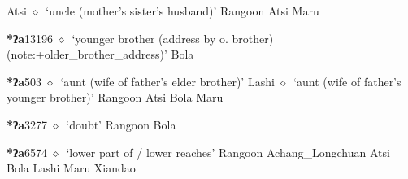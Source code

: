 \begin{list}{}{\leftmargin=1.5em \itemindent=-1.5em}
         Atsi 
\hspace{1ex}
         $\diamond$~`uncle (mother's sister's husband)'
         Rangoon 
\hspace{1ex}
         Atsi 
\hspace{1ex}
         Maru 
  \item {\footnotesize \textbf{*ʔa}}{\tiny 13196}
\hspace{1ex}
         $\diamond$~`younger brother (address by o. brother) (note:+older_brother_address)'
         Bola 
  \item {\footnotesize \textbf{*ʔa}}{\tiny 503}
\hspace{1ex}
         $\diamond$~`aunt (wife of father's elder brother)'
         Lashi 
\hspace{1ex}
         $\diamond$~`aunt (wife of father's younger brother)'
         Rangoon 
\hspace{1ex}
         Atsi 
\hspace{1ex}
         Bola 
\hspace{1ex}
         Maru 
  \item {\footnotesize \textbf{*ʔa}}{\tiny 3277}
\hspace{1ex}
         $\diamond$~`doubt'
         Rangoon 
\hspace{1ex}
         Bola 
  \item {\footnotesize \textbf{*ʔa}}{\tiny 6574}
\hspace{1ex}
         $\diamond$~`lower part of / lower reaches'
         Rangoon 
\hspace{1ex}
         Achang\_Longchuan 
\hspace{1ex}
         Atsi 
\hspace{1ex}
         Bola 
\hspace{1ex}
         Lashi 
\hspace{1ex}
         Maru 
\hspace{1ex}
         Xiandao 
  \end{list}
